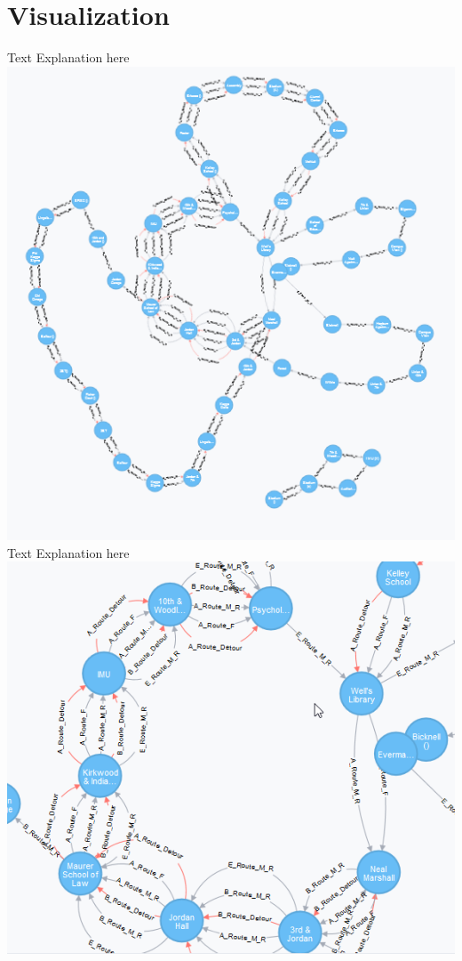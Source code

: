\documentclass[12pt]{article}
\begin{document}
\section{Visualization}
Text Explanation here\\
\includegraphics[scale=1]{resources/neo4j1}\\[1cm] 
Text Explanation here\\
\includegraphics[scale=1]{resources/neo4j2}\\[1cm] 
\end{document}
